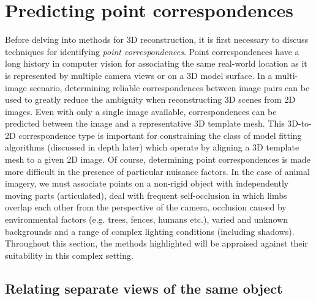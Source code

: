 \section{Predicting point correspondences}

Before delving into methods for 3D reconstruction, it is first necessary to discuss techniques for identifying \emph{point correspondences}. Point correspondences have a long history in computer vision for associating the same real-world location as it is represented by multiple camera views or on a 3D model surface. In a multi-image scenario, determining reliable correspondences between image pairs can be used to greatly reduce the ambiguity when reconstructing 3D scenes from 2D images. Even with only a single image available, correspondences can be predicted between the image and a representative 3D template mesh. This 3D-to-2D correspondence type is important for constraining the class of model fitting algorithms (discussed in depth later) which operate by aligning a 3D template mesh to a given 2D image. Of course, determining point correspondences is made more difficult in the presence of particular nuisance factors. In the case of animal imagery, we must associate points on a non-rigid object with independently moving parts (articulated), deal with frequent self-occlusion in which limbs overlap each other from the perspective of the camera, occlusion caused by environmental factors (e.g. trees, fences, humans etc.), varied and unknown backgrounds and a range of complex lighting conditions (including shadows). Throughout this section, the methods highlighted will be appraised against their suitability in this complex setting.


\subsection{Relating separate views of the same object}

